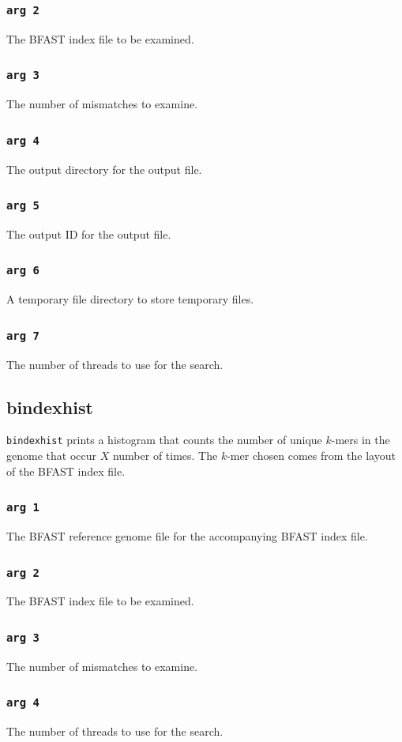 \documentclass[a4paper,12pt]{book}
\newcommand{\TT}[1]{{\tt #1}} %
\newcommand{\BRGF}{BFAST reference genome file} %
\newcommand{\BIF}{BFAST index file} %
\begin{document}
\subsubsection{\TT{arg 2}}
The \BIF{} to be examined.
\subsubsection{\TT{arg 3}}
The number of mismatches to examine.
\subsubsection{\TT{arg 4}}
The output directory for the output file.
\subsubsection{\TT{arg 5}}
The output ID for the output file.
\subsubsection{\TT{arg 6}}
A temporary file directory to store temporary files.
\subsubsection{\TT{arg 7}}
The number of threads to use for the search.

\subsection{bindexhist}
\label{sec:bindexhist}
\TT{bindexhist} prints a histogram that counts the number of unique $k$-mers in the genome that occur $X$ number of
times.  
The $k$-mer chosen comes from the layout of the \BIF{}.

\subsubsection{\TT{arg 1}}
The \BRGF{} for the accompanying \BIF{}.
\subsubsection{\TT{arg 2}}
The \BIF{} to be examined.
\subsubsection{\TT{arg 3}}
The number of mismatches to examine.
\subsubsection{\TT{arg 4}}
The number of threads to use for the search.
\end{document}
